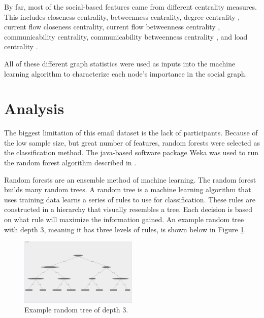 \documentclass{article}
\begin{document}
\par
By far, most of the social-based features came from different centrality measures.  This includes closeness centrality, betweenness centrality, degree centrality \cite{borgatti2011analyzing}, current flow closeness centrality, current flow betweenness centrality \cite{brandes2005centrality}, communicability centrality, communicability betweenness centrality \cite{estrada2008communicability}, and load centrality \cite{newman2001scientific}.
\par
All of these different graph statistics were used as inputs into the machine learning algorithm to characterize each node's importance in the social graph.


\section{Analysis} \label{Analysis}
The biggest limitation of this email dataset is the lack of participants.  Because of the low sample size, but great number of features, random forests were selected as the classification method.  The java-based software package Weka was used to run the random forest algorithm described in \cite{Breiman2001}.
\par
Random forests are an ensemble method of machine learning.  The random forest builds many random trees.  A random tree is a machine learning algorithm that uses training data learns a series of rules to use for classification.  These rules are constructed in a hierarchy that visually resembles a tree.  Each decision is based on what rule will maximize the information gained.  An example random tree with depth 3, meaning it has three levels of rules, is shown below in Figure \ref{fig:ex_tree}.
\begin{figure}[H]
    \centering
        \includegraphics[width=0.5\textwidth]{3_level_tree}
        \caption{Example random tree of depth 3.}
        \label{fig:ex_tree}
\end{figure}
\par
\end{document}

